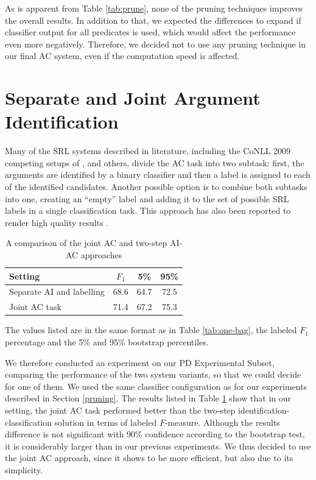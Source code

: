 \documentclass[12pt,notitlepage]{report}
\begin{document}
As is apparent from Table \ref{tab:prune}, none of the pruning techniques improves the overall results. In addition to that, we expected the differences to expand if classifier output for all predicates is used, which would affect the performance even more negatively. Therefore, we decided not to use any pruning technique in our final AC system, even if the computation speed is affected.

\section{Separate and Joint Argument Identification}\label{ai-ac}

Many of the SRL systems described in literature, including the CoNLL 2009 competing setups of \citet{chen09}, \citet{bohnet09} and others, divide the AC task into two subtask: first, the arguments are identified by a binary classifier and then a label is assigned to each of the identified candidates. Another possible option is to combine both subtasks into one, creating an ``empty'' label and adding it to the set of possible SRL labels in a single classification task. This approach has also been reported to render high quality results \citep{che09,asahara09}.

\begin{table}[htb]\label{tab:ai-ac}
\caption{A comparison of the joint AC and two-step AI-AC approaches}\footnotesize
\begin{center}
\begin{tabular}{|l|c|c|c|}\hline
\bf Setting & $F_1$ & \bf 5\% & \bf 95\% \\\hline
Separate AI and labelling & 68.6 & 64.7 & 72.5 \\
Joint AC task & 71.4 & 67.2 & 75.3 \\\hline
\end{tabular}
\end{center}
The values listed are in the same format as in Table \ref{tab:one-bag}, the labeled $F_1$ percentage and the 5\% and 95\% bootstrap percentiles.
\end{table}

We therefore conducted an experiment on our PD Experimental Subset, comparing the performance of the two system variants, so that we could decide for one of them. We used the same classifier configuration as for our experiments described in Section \ref{pruning}. The results listed in Table \ref{tab:ai-ac} show that in our setting, the joint AC task performed better than the two-step identification-classification solution in terms of labeled $F$-measure. Although the results difference is not significant with $90\%$ confidence according to the bootstrap test, it is considerably larger than in our previous experiments. We thus decided to use the joint AC approach, since it shows to be more efficient, but also due to its simplicity.
\end{document}
